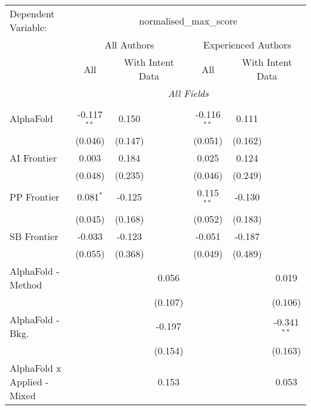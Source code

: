 \begingroup
\centering
\begin{tabular}{lcccccc}
   \tabularnewline \midrule \midrule
   Dependent Variable: & \multicolumn{6}{c}{normalised\_max\_score}\\
 & \multicolumn{3}{c}{All Authors} & \multicolumn{3}{c}{Experienced Authors} \\
\cmidrule(lr){2-4} \cmidrule(lr){5-7}
 & \multicolumn{1}{c}{All} & \multicolumn{2}{c}{With Intent Data} & \multicolumn{1}{c}{All} & \multicolumn{2}{c}{With Intent Data} \\
\cmidrule(lr){2-2} \cmidrule(lr){3-4} \cmidrule(lr){5-5} \cmidrule(lr){6-7}
 & \multicolumn{6}{c}{\textit{All Fields}} \\ \\
   AlphaFold                     & -0.117$^{**}$ & 0.150   &         & -0.116$^{**}$ & 0.111   &   \\   
                                 & (0.046)       & (0.147) &         & (0.051)       & (0.162) &   \\   
   AI Frontier                   & 0.003         & 0.184   &         & 0.025         & 0.124   &   \\   
                                 & (0.048)       & (0.235) &         & (0.046)       & (0.249) &   \\   
   PP Frontier                   & 0.081$^{*}$   & -0.125  &         & 0.115$^{**}$  & -0.130  &   \\   
                                 & (0.045)       & (0.168) &         & (0.052)       & (0.183) &   \\   
   SB Frontier                   & -0.033        & -0.123  &         & -0.051        & -0.187  &   \\   
                                 & (0.055)       & (0.368) &         & (0.049)       & (0.489) &   \\   
   AlphaFold - Method            &               &         & 0.056   &               &         & 0.019\\   
                                 &               &         & (0.107) &               &         & (0.106)\\   
   AlphaFold - Bkg.              &               &         & -0.197  &               &         & -0.341$^{**}$\\   
                                 &               &         & (0.154) &               &         & (0.163)\\   
   AlphaFold x Applied - Mixed   &               &         & 0.153   &               &         & 0.053\\   

\end{tabular}
